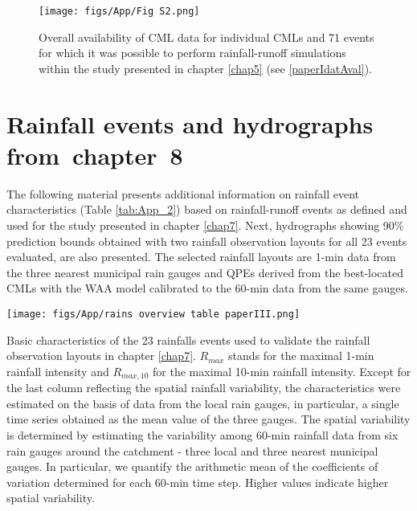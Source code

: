 \documentclass{ctuthesis}\usepackage[]{graphicx}\usepackage[]{color}
\begin{document}
\FloatBarrier


\begin{figure}[h]
\begin{center}
\texttt{[image: figs/App/Fig S2.png]}
\caption{Overall availability of CML data for individual CMLs and 71 events for which it was possible to perform rainfall-runoff simulations within the study presented in chapter \ref{chap5} (see \ref{paperIdatAval}).} 
\label{fig:App_1}
\end{center}
\end{figure}





\section{Rainfall events and hydrographs from~chapter~8} \label{App_chap8}

The following material presents additional information on  rainfall event characteristics (Table \ref{tab:App_2}) based on rainfall-runoff events as defined and used for the study presented in chapter \ref{chap7}. Next, hydrographs showing 90\% prediction bounds obtained with two rainfall observation layouts for all 23 events evaluated, are also presented. The selected  rainfall layouts are 1-min data from the three nearest municipal rain gauges and QPEs derived from the best-located CMLs with the WAA model calibrated to the 60-min data from the same gauges.


\begin{table}[p]
\begin{center}
\texttt{[image: figs/App/rains overview table paperIII.png]}
\caption{Basic characteristics of the 23 rainfalls events used to validate the rainfall observation layouts in chapter \ref{chap7}. $R_{max}$ stands for the maximal 1-min rainfall intensity and $R_{max,10}$ for the maximal 10-min rainfall intensity. Except for the last column reflecting the spatial rainfall variability, the characteristics were estimated on the basis of data from the local rain gauges, in particular, a single time series obtained as the mean value of the three gauges.  The spatial variability is determined by estimating the variability among 60-min rainfall data from six rain gauges around the catchment - three local and three nearest municipal gauges. In particular, we quantify the arithmetic mean of the coefficients of variation determined for each 60-min time step. Higher values indicate higher spatial variability.} 
\label{tab:App_2}
\end{center}
\end{table}
\end{document}
